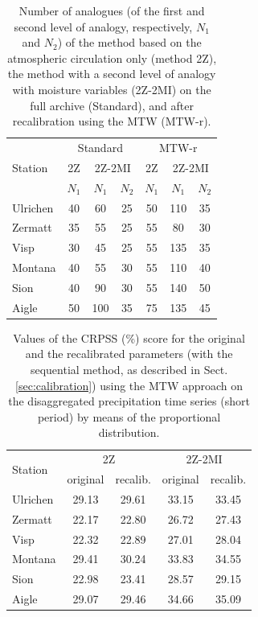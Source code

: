 \documentclass[hess, manuscript]{copernicus}
\begin{document}
	\begin{table}[htb]
		\caption{Number of analogues (of the first and second level of analogy, respectively, $N_{1}$ and $N_{2}$) of the method based on the atmospheric circulation only (method 2Z), the method with a second level of analogy with moisture variables (2Z-2MI) on the full archive (Standard), and after recalibration using the MTW (MTW-r).}
		\begin{center}
			\begin{tabular}{l c c c c c c }
				\hline
				\multirow{3}{*}{Station} & \multicolumn{3}{c}{Standard} & \multicolumn{3}{c}{MTW-r} \\
				& 2Z & \multicolumn{2}{c}{2Z-2MI} & 2Z & \multicolumn{2}{c}{2Z-2MI}\\
				& $N_{1}$ & $N_{1}$ & $N_{2}$ & $N_{1}$ & $N_{1}$ & $N_{2}$\\ 
				\hline
				Ulrichen & 40 & 60 & 25 & 50 & 110 & 35\\
				Zermatt & 35 & 55 & 25 & 55 & 80 & 30\\
				Visp & 30 & 45 & 25 & 55 & 135 & 35\\
				Montana & 40 & 55 & 30 & 55 & 110 & 40\\
				Sion & 40 & 90 & 30 & 55 & 140 & 50\\
				Aigle & 50 & 100 & 35 & 75 & 135 & 45\\ 
				\hline
			\end{tabular}
		\end{center}	
		\label{table:analog_nb}
	\end{table}
	
	\begin{table}[htb]
		\caption{Values of the CRPSS (\%) score for the original and the recalibrated parameters (with the sequential method, as described in Sect. \ref{sec:calibration}) using the MTW approach on the disaggregated precipitation time series (short period) by means of the proportional distribution.}
		\begin{center}
			\begin{tabular}{l c c c c}
				\hline
				\multirow{2}{*}{Station} & \multicolumn{2}{c}{2Z} & \multicolumn{ 2}{c}{2Z-2MI} \\
				& original & recalib. & original & recalib. \\
				\hline
				Ulrichen & 29.13 & 29.61 & 33.15 & 33.45 \\
				Zermatt & 22.17 & 22.80 & 26.72 & 27.43 \\
				Visp & 22.32 & 22.89 & 27.01 & 28.04 \\
				Montana & 29.41 & 30.24 & 33.83 & 34.55 \\
				Sion & 22.98 & 23.41 & 28.57 & 29.15 \\
				Aigle & 29.07 & 29.46 & 34.66 & 35.09 \\
				\hline
			\end{tabular}
		\end{center}
		\label{table:disaggregation_proportional}
	\end{table}
	
\end{document}
